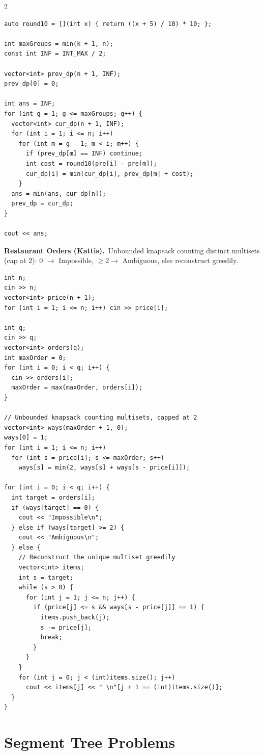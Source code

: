 \documentclass[10pt,letterpaper]{extarticle}
\newcommand{\prob}[2]{\par\addvspace{10pt}\noindent\label{prob:#1}\textbf{\normalsize #1.}\ {\small #2}\par\nopagebreak}
\begin{document}
\begin{multicols*}{2}
\begin{lstlisting}[style=cppt]
auto round10 = [](int x) { return ((x + 5) / 10) * 10; };

int maxGroups = min(k + 1, n);
const int INF = INT_MAX / 2;

vector<int> prev_dp(n + 1, INF);
prev_dp[0] = 0;

int ans = INF;
for (int g = 1; g <= maxGroups; g++) {
  vector<int> cur_dp(n + 1, INF);
  for (int i = 1; i <= n; i++)
    for (int m = g - 1; m < i; m++) {
      if (prev_dp[m] == INF) continue;
      int cost = round10(pre[i] - pre[m]);
      cur_dp[i] = min(cur_dp[i], prev_dp[m] + cost);
    }
  ans = min(ans, cur_dp[n]);
  prev_dp = cur_dp;
}

cout << ans;
\end{lstlisting}

\prob{Restaurant Orders (Kattis)}{Unbounded knapsack counting distinct multisets (cap at 2): 0 $\to$ Impossible, $\ge 2 \to$ Ambiguous, else reconstruct greedily.}
\begin{lstlisting}[style=cppt]
int n;
cin >> n;
vector<int> price(n + 1);
for (int i = 1; i <= n; i++) cin >> price[i];

int q;
cin >> q;
vector<int> orders(q);
int maxOrder = 0;
for (int i = 0; i < q; i++) {
  cin >> orders[i];
  maxOrder = max(maxOrder, orders[i]);
}

// Unbounded knapsack counting multisets, capped at 2
vector<int> ways(maxOrder + 1, 0);
ways[0] = 1;
for (int i = 1; i <= n; i++)
  for (int s = price[i]; s <= maxOrder; s++)
    ways[s] = min(2, ways[s] + ways[s - price[i]]);

for (int i = 0; i < q; i++) {
  int target = orders[i];
  if (ways[target] == 0) {
    cout << "Impossible\n";
  } else if (ways[target] >= 2) {
    cout << "Ambiguous\n";
  } else {
    // Reconstruct the unique multiset greedily
    vector<int> items;
    int s = target;
    while (s > 0) {
      for (int j = 1; j <= n; j++) {
        if (price[j] <= s && ways[s - price[j]] == 1) {
          items.push_back(j);
          s -= price[j];
          break;
        }
      }
    }
    for (int j = 0; j < (int)items.size(); j++)
      cout << items[j] << " \n"[j + 1 == (int)items.size()];
  }
}
\end{lstlisting}

\section*{Segment Tree Problems}


\end{multicols*}
\end{document}
